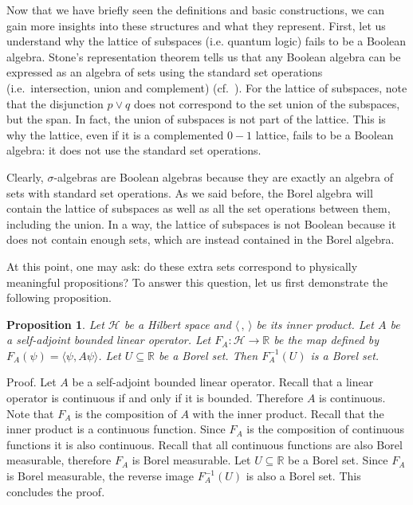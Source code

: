 \documentclass[11pt, executivepaper]{article}
\newtheorem{prop}{Proposition}
\begin{document}
Now that we have briefly seen the definitions and basic constructions, we can gain more insights into these structures and what they represent. First, let us understand why the lattice of subspaces (i.e. quantum logic) fails to be a Boolean algebra. Stone's representation theorem tells us that any Boolean algebra can be expressed as an algebra of sets using the standard set operations (i.e.\ intersection, union and complement) (cf.\ \cite{Davey:2002}). For the lattice of subspaces, note that the disjunction $p \vee q$ does not correspond to the set union of the subspaces, but the span. In fact, the union of subspaces is not part of the lattice.  This is why the lattice, even if it is a complemented $0-1$ lattice, fails to be a Boolean algebra: it does not use the standard set operations.

Clearly, $\sigma$-algebras are Boolean algebras because they are exactly an algebra of sets with standard set operations. As we said before, the Borel algebra will contain the lattice of subspaces as well as all the set operations between them, including the union. In a way, the lattice of subspaces is not Boolean because it does not contain enough sets, which are instead contained in the Borel algebra.

At this point, one may ask: do these extra sets correspond to physically meaningful propositions? To answer this question, let us first demonstrate the following proposition.

\begin{prop}
	Let $\mathcal{H}$ be a Hilbert space and $\langle \, , \, \rangle$ be its inner product. Let $A$ be a self-adjoint bounded linear operator. Let $F_A : \mathcal{H} \to \mathbb{R}$ be the map defined by $F_A(\psi) = \langle \psi , A \psi \rangle$. Let $U \subseteq \mathbb{R}$ be a Borel set. Then $F_A^{-1}(U)$ is a Borel set.
\end{prop}

Proof. Let $A$ be a self-adjoint bounded linear operator. Recall that a linear operator is continuous if and only if it is bounded. Therefore $A$ is continuous. Note that $F_A$ is the composition of $A$ with the inner product. Recall that the inner product is a continuous function. Since $F_A$ is the composition of continuous functions it is also continuous. Recall that all continuous functions are also Borel measurable, therefore $F_A$ is Borel measurable. Let $U \subseteq \mathbb{R}$ be a Borel set. Since $F_A$ is Borel measurable, the reverse image $F_A^{-1}(U)$ is also a Borel set. This concludes the proof.
\end{document}
